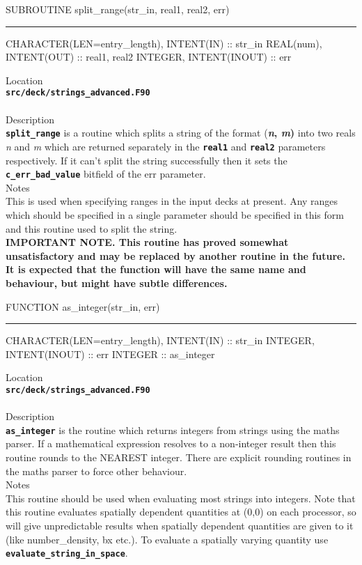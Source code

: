 \documentclass[12pt,a4paper]{article}
\newcommand{\HRule}{\rule[0.3cm]{\linewidth}{0.5mm}}
\newcommand{\inlinecode}[1]{{\color{warwickred} \bf\texttt{#1}}}
\begin{document}
\pagebreak
\begin{codedef}
SUBROUTINE split_range(str_in, real1, real2, err)
\HRule
CHARACTER(LEN=entry_length), INTENT(IN) :: str_in
REAL(num), INTENT(OUT) :: real1, real2
INTEGER, INTENT(INOUT) :: err
\end{codedef}
\vspace{1cm}
{\Large Location\\}
\inlinecode{src/deck/strings\_advanced.F90}\\
\\[0.5cm]
{\Large Description\\}
\inlinecode{split\_range} is a routine which splits a string of the format
{(\bf{\it n}, {\it m})} into two reals {\it n} and {\it m} which are returned
separately in the \inlinecode{real1} and \inlinecode{real2} parameters
respectively.  If it can't split the string successfully then it sets the
\inlinecode{c\_err\_bad\_value} bitfield of the err parameter.
\\[0.5cm]
{\Large Notes\\}
This is used when specifying ranges in the input decks at present. Any
ranges which should be specified in a single parameter should be specified in
this form and this routine used to split the string.\\ {\bf IMPORTANT NOTE. This
routine has proved somewhat unsatisfactory and may be replaced by another
routine in the future. It is expected that the function will have the same name
and behaviour, but might have subtle differences.}

\pagebreak
\begin{codedef}
FUNCTION as_integer(str_in, err)
\HRule
CHARACTER(LEN=entry_length), INTENT(IN) :: str_in
INTEGER, INTENT(INOUT) :: err
INTEGER :: as_integer
\end{codedef}
\vspace{1cm}
{\Large Location\\}
\inlinecode{src/deck/strings\_advanced.F90}\\
\\[0.5cm]
{\Large Description\\}
\inlinecode{as\_integer} is the routine which returns integers from strings
using the maths parser. If a mathematical expression resolves to a non-integer
result then this routine rounds to the NEAREST integer. There are explicit
rounding routines in the maths parser to force other behaviour.
\\[0.5cm]
{\Large Notes\\}
This routine should be used when evaluating most strings into integers. Note
that this routine evaluates spatially dependent quantities at (0,0) on each
processor, so will give unpredictable results when spatially dependent
quantities are given to it (like number\_density, bx etc.). To evaluate a spatially varying
quantity use \inlinecode{evaluate\_string\_in\_space}.
\end{document}
